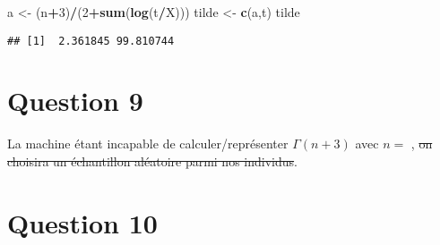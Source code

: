 \documentclass[
  12pt,
]{scrreprt}
\newenvironment{Shaded}{\begin{snugshade}}{\end{snugshade}}
\newcommand{\DecValTok}[1]{\textcolor[rgb]{0.00,0.00,0.81}{#1}}
\newcommand{\KeywordTok}[1]{\textcolor[rgb]{0.13,0.29,0.53}{\textbf{#1}}}
\newcommand{\NormalTok}[1]{#1}
\newcommand{\OperatorTok}[1]{\textcolor[rgb]{0.81,0.36,0.00}{\textbf{#1}}}
\newcommand{\StringTok}[1]{\textcolor[rgb]{0.31,0.60,0.02}{#1}}
\begin{document}
\begin{Shaded}
\begin{Highlighting}[]
\NormalTok{a <-}\StringTok{ }\NormalTok{(n}\OperatorTok{+}\DecValTok{3}\NormalTok{)}\OperatorTok{/}\NormalTok{(}\DecValTok{2}\OperatorTok{+}\KeywordTok{sum}\NormalTok{(}\KeywordTok{log}\NormalTok{(t}\OperatorTok{/}\NormalTok{X)))}
\NormalTok{tilde <-}\StringTok{ }\KeywordTok{c}\NormalTok{(a,t)}
\NormalTok{tilde}
\end{Highlighting}
\end{Shaded}

\begin{verbatim}
## [1]  2.361845 99.810744
\end{verbatim}

\hypertarget{question-9}{%
\section{Question 9}\label{question-9}}

La machine étant incapable de calculer/représenter \(\Gamma(n+3)\) avec \(n =\) , \sout{on choisira un échantillon aléatoire parmi nos individus}.

\hypertarget{question-10}{%
\section{Question 10}\label{question-10}}
\end{document}
